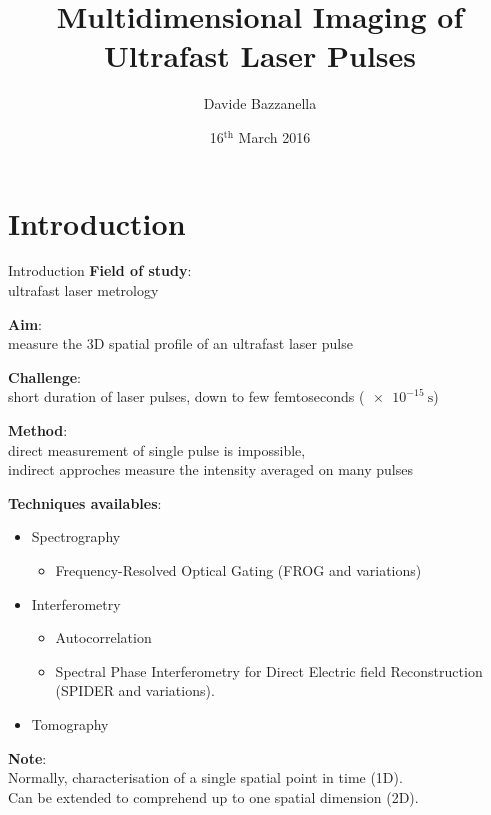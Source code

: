 \documentclass[11pt]{beamer}
\author{Davide Bazzanella}
\title{Multidimensional Imaging of Ultrafast Laser Pulses}
\institute{Imperial College London}
\date{16$^{\mathrm{th}}$ March 2016}
\begin{document}
\begin{frame}
\titlepage
\end{frame}


\section{Introduction}
\begin{frame}{Introduction}
\textbf{Field of study}:\\
	ultrafast laser metrology
	
\vspace{15pt}
\textbf{Aim}:\\
	measure the 3D spatial profile of an ultrafast laser pulse

\vspace{15pt}
\textbf{Challenge}:\\
	short duration of laser pulses, down to few femtoseconds ($\SI{e-15}{\s}$)
	
\vspace{15pt}
\textbf{Method}:\\
	direct measurement of single pulse is impossible,\\
	indirect approches measure the intensity averaged on many pulses
\end{frame}

\begin{frame}
\textbf{Techniques availables}:\\
\begin{itemize}
\item Spectrography
	\begin{itemize}
		\item Frequency-Resolved Optical Gating (FROG and variations)
	\end{itemize}
\item Interferometry
	\begin{itemize}
		\item Autocorrelation
		\item Spectral Phase Interferometry for Direct Electric field Reconstruction (SPIDER and variations).
	\end{itemize}
	\item Tomography
\end{itemize}

\vspace{15pt}
\textbf{Note}:\\
Normally, characterisation of a single spatial point in time (1D).\\
Can be extended to comprehend up to one spatial dimension (2D).
\end{frame}
\end{document}
